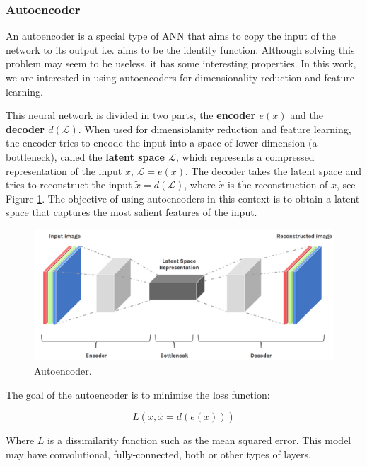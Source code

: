 \subsubsection{Autoencoder}
    
An autoencoder is a special type of ANN that aims to copy the input of the network to its output i.e. aims to be the identity function. Although solving this problem may seem to be useless, it has some interesting properties. In this work, we are interested in using autoencoders for dimensionality reduction and feature learning. 

This neural network is divided in two parts, the \textbf{encoder $e(x)$} and the \textbf{decoder $d(\mathcal{L})$}. When used for dimensiolanity reduction and feature learning, the encoder tries to encode the input into a space of lower dimension (a bottleneck), called the \textbf{latent space $\mathcal{L}$}, which represents a compressed representation of the input $x$, $\mathcal{L}=e(x)$. The decoder takes the latent space and tries to reconstruct the input $\widetilde x = d(\mathcal{L})$, where $\widetilde x$ is the reconstruction of $x$, see Figure \ref{fig:ae}. The objective of using autoencoders in this context is to obtain a latent space that captures the most salient features of the input. 
    
\begin{figure}[H]
    \centering
    \includegraphics[width=0.8\linewidth]{imagenes/cap1/ae.png}
    \caption{Autoencoder.}
    \label{fig:ae}
\end{figure}
    
The goal of the autoencoder is to minimize the loss function:

\begin{equation}
    L(x, \widetilde x = d(e(x)))
\end{equation}

Where $L$ is a dissimilarity function such as the mean squared error. This model may have convolutional, fully-connected, both or other types of layers.

